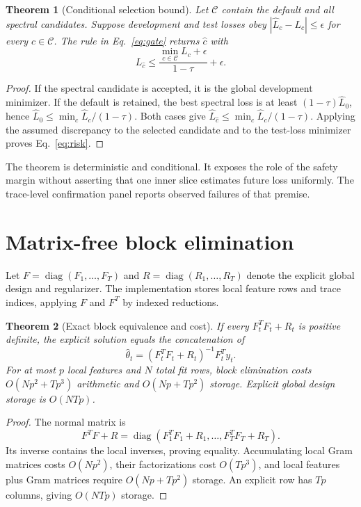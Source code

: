 \documentclass[10pt,letterpaper,twoside]{article}
\newtheorem{theorem}{Theorem}
\begin{document}
\begin{theorem}[Conditional selection bound]
\label{thm:gate}
Let $\mathcal C$ contain the default and all spectral candidates. Suppose
development and test losses obey $|\widehat L_c-L_c|\le\epsilon$ for every
$c\in\mathcal C$. The rule in Eq.~\eqref{eq:gate} returns $\widehat c$ with
\begin{equation}
 L_{\widehat c}\le
 \frac{\min_{c\in\mathcal C}L_c+\epsilon}{1-\tau}+\epsilon. \label{eq:risk}
\end{equation}
\end{theorem}
\begin{proof}
If the spectral candidate is accepted, it is the global development minimizer.
If the default is retained, the best spectral loss is at least
$(1-\tau)\widehat L_0$, hence
$\widehat L_0\le\min_c\widehat L_c/(1-\tau)$. Both cases give
$\widehat L_{\widehat c}\le\min_c\widehat L_c/(1-\tau)$.
Applying the assumed discrepancy to the selected candidate and to the
test-loss minimizer proves Eq.~\eqref{eq:risk}.
\end{proof}

The theorem is deterministic and conditional. It exposes the role of the
safety margin without asserting that one inner slice estimates future loss
uniformly. The trace-level confirmation panel reports observed failures of
that premise.

\section{Matrix-free block elimination}

Let $F=\operatorname{diag}(F_1,\ldots,F_T)$ and
$R=\operatorname{diag}(R_1,\ldots,R_T)$ denote the explicit global design and
regularizer. The implementation stores local feature rows and trace indices,
applying $F$ and $F^T$ by indexed reductions.

\begin{theorem}[Exact block equivalence and cost]
\label{thm:block}
If every $F_t^TF_t+R_t$ is positive definite, the explicit solution equals
the concatenation of
\begin{equation}
 \widehat\theta_t=(F_t^TF_t+R_t)^{-1}F_t^Ty_t.
\end{equation}
For at most $p$ local features and $N$ total fit rows, block elimination costs
$O(Np^2+Tp^3)$ arithmetic and $O(Np+Tp^2)$ storage. Explicit global design
storage is $O(NTp)$.
\end{theorem}
\begin{proof}
The normal matrix is
\begin{equation}
 F^TF+R=\operatorname{diag}(F_1^TF_1+R_1,\ldots,F_T^TF_T+R_T).
\end{equation}
Its inverse contains the local inverses, proving equality. Accumulating local
Gram matrices costs $O(Np^2)$, their factorizations cost $O(Tp^3)$, and local
features plus Gram matrices require $O(Np+Tp^2)$ storage. An explicit row has
$Tp$ columns, giving $O(NTp)$ storage.
\end{proof}
\end{document}
